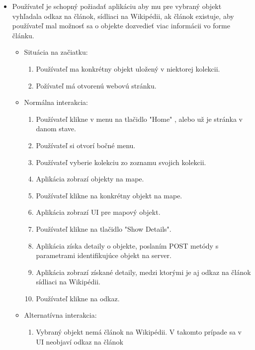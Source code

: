 \begin{itemize}
      \item Používateľ je schopný požiadať aplikáciu aby mu pre vybraný objekt vyhľadala odkaz na článok, sídliaci na Wikipédii, ak článok existuje, aby používateľ mal možnosť sa o objekte dozvedieť viac informácii vo forme článku.
            \begin{itemize}
                  \item Situácia na začiatku:
                        \begin{enumerate}
                              \item Používateľ ma konkrétny objekt uložený v niektorej kolekcii.
                              \item Požívateľ má otvorenú webovú stránku.
                        \end{enumerate}
                  \item Normálna interakcia:
                        \begin{enumerate}
                              \item Používateľ klikne v menu na tlačidlo "Home" , alebo už je stránka v danom stave.
                              \item Používateľ si otvorí bočné menu.
                              \item Používateľ vyberie kolekciu zo zoznamu svojich kolekcii.
                              \item Aplikácia zobrazí objekty na mape.
                              \item Používateľ klikne na konkrétny objekt na mape.
                              \item Aplikácia zobrazí UI pre mapový objekt.
                              \item Používateľ klikne na tlačidlo "Show Details".
                              \item Aplikácia získa detaily o objekte, poslaním POST metódy s parametrami identifikujúce objekt na server.
                              \item Aplikácia zobrazí získané detaily, medzi ktorými je aj odkaz na článok sídliaci na Wikipédii.
                              \item Používateľ klikne na odkaz.
                        \end{enumerate}
                  \item Alternatívna interakcia:
                        \begin{enumerate}
                              \item Vybraný objekt nemá článok na Wikipédii. V takomto prípade sa v UI neobjaví odkaz na článok

\end{enumerate}
\end{itemize}
\end{itemize}
